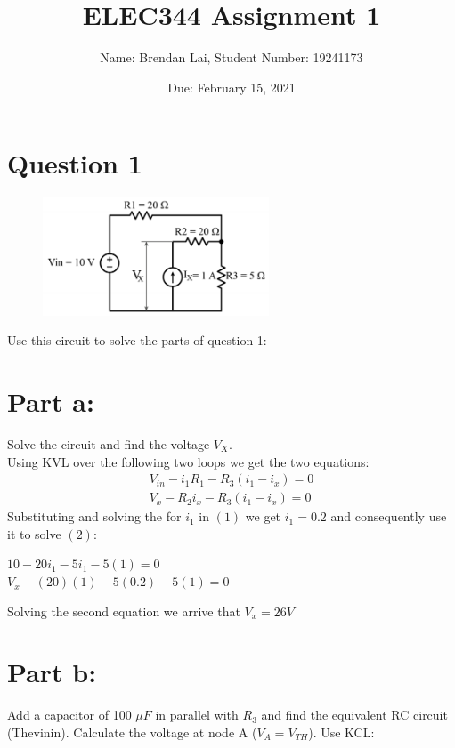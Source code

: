 \documentclass{article}
\title{ELEC344 Assignment 1}
\author{Name: Brendan Lai, Student Number: 19241173}
\date{Due: February 15, 2021}
\begin{document}
  
\maketitle
  
\tableofcontents

\section{Question 1}
\begin{figure}[h]
    \centering
    \includegraphics[width=0.6\textwidth]{q1-circuit}
    \label{fig1: q1 circuit}
\end{figure}
Use this circuit to solve the parts of question 1:
    
\section*{Part a:}
Solve the circuit and find the voltage $V_X$. \\
Using KVL over the following two loops we get the two equations:
\begin{align*}
    V_{in} - i_1R_1 - R_3(i_1 - i_x) = 0 \\
    V_x - R_2i_x - R_3(i_1-i_x) = 0
\end{align*}
Substituting and solving the for $i_1$ in $(1)$ we get $i_1 = 0.2$ and consequently use it to solve $(2)$:

\begin{center}
$10 - 20i_1 - 5i_1 - 5(1) = 0$ \\
$V_x - (20)(1) - 5(0.2) - 5(1) = 0$
\end{center}
Solving the second equation we arrive that $V_x = 26 V$

\section*{Part b:}
Add a capacitor of 100 $\mu F$ in parallel with $R_3$ and find the equivalent RC circuit (Thevinin). Calculate the voltage at node A ($V_A = V_{TH}$). Use KCL:\\
\end{document}
